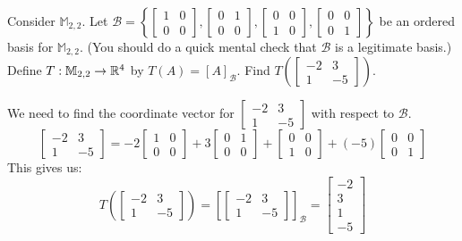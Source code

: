 \documentclass{ximera}
\begin{document}
\begin{example}\label{ex:abstvectsplintranscoordvect1}
Consider $\mathbb{M}_{2,2}$.  Let $\mathcal{B}=\left\{\begin{bmatrix}1&0\\0&0\end{bmatrix}, \begin{bmatrix}0&1\\0&0\end{bmatrix}, \begin{bmatrix}0&0\\1&0\end{bmatrix}, \begin{bmatrix}0&0\\0&1\end{bmatrix}\right\}$ be an ordered basis for $\mathbb{M}_{2,2}$.  (You should do a quick mental check that $\mathcal{B}$ is a legitimate basis.)  Define $T:\mathbb{M}_{2,2}\rightarrow \mathbb{R}^4$ by $T(A)=[A]_{\mathcal{B}}$.  Find $T\left(\begin{bmatrix}-2&3\\1&-5\end{bmatrix}\right)$.
\begin{explanation}
We need to find the coordinate vector for $\begin{bmatrix}-2&3\\1&-5\end{bmatrix}$ with respect to $\mathcal{B}$.
$$\begin{bmatrix}-2&3\\1&-5\end{bmatrix}=-2\begin{bmatrix}1&0\\0&0\end{bmatrix}+ 3\begin{bmatrix}0&1\\0&0\end{bmatrix}+ \begin{bmatrix}0&0\\1&0\end{bmatrix}+ (-5)\begin{bmatrix}0&0\\0&1\end{bmatrix}$$
This gives us:
$$T\left(\begin{bmatrix}-2&3\\1&-5\end{bmatrix}\right)=\left[\begin{bmatrix}-2&3\\1&-5\end{bmatrix}\right]_{\mathcal{B}}=\begin{bmatrix}-2\\3\\1\\-5\end{bmatrix}$$
\end{explanation}
\end{example}
\end{document}
